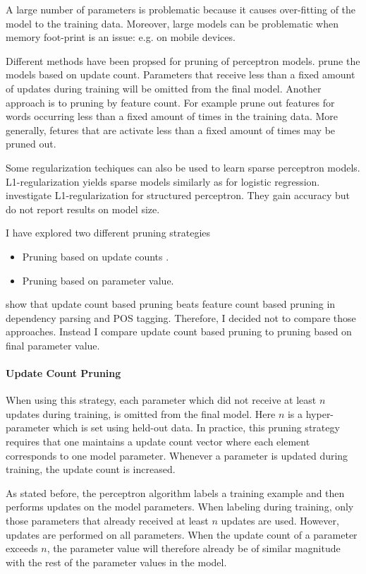 A large number of parameters is problematic because it causes
over-fitting of the model to the training data. Moreover, large models
can be problematic when memory foot-print is an issue: e.g. on mobile
devices.

Different methods have been propsed for pruning of perceptron
models. \cite{Goldberg2011} prune the models based on update
count. Parameters that receive less than a fixed amount of updates
during training will be omitted from the final model. Another approach
is to pruning by feature count. For example \cite{Hulden2013} prune
out features for words occurring less than a fixed amount of times in
the training data. More generally, fetures that are activate less than
a fixed amount of times may be pruned out. 

Some regularization techiques can also be used to learn sparse
perceptron models. L1-regularization yields sparse models similarly as
for logistic regression. \cite{Zhang2014} investigate
L1-regularization for structured perceptron. They gain accuracy but do
not report results on model size.

I have explored two different pruning strategies
\begin{itemize}
\item Pruning based on update counts \citep{Goldberg2011}.
\item Pruning based on parameter value.
\end{itemize}
\cite{Goldberg2011} show that update count based pruning beats feature
count based pruning in dependency parsing and POS tagging. Therefore,
I decided not to compare those approaches. Instead I compare update
count based pruning to pruning based on final parameter value.

\paragraph{Update Count Pruning} When using this strategy, each
parameter which did not receive at least $n$ updates during training,
is omitted from the final model. Here $n$ is a hyper-parameter which
is set using held-out data. In practice, this pruning strategy
requires that one maintains a update count vector where each element
corresponds to one model parameter. Whenever a parameter is updated
during training, the update count is increased.

As stated before, the perceptron algorithm labels a training example
and then performs updates on the model parameters. When labeling
during training, only those parameters that already received at least
$n$ updates are used. However, updates are performed on all
parameters. When the update count of a parameter exceeds $n$, the
parameter value will therefore already be of similar magnitude with
the rest of the parameter values in the model.

